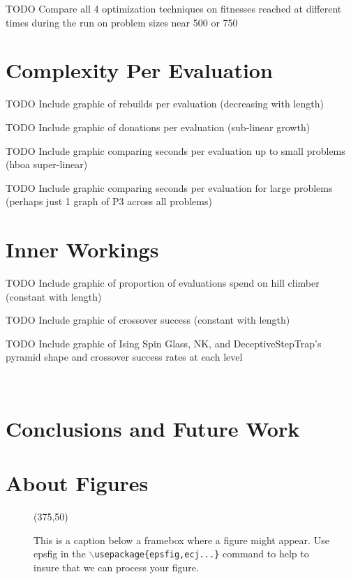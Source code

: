 \documentclass[twoside]{article}
\begin{document}
TODO Compare all 4 optimization techniques on fitnesses reached at different times
during the run on problem sizes near 500 or 750


\section{Complexity Per Evaluation}
TODO Include graphic of rebuilds per evaluation (decreasing with length)

TODO Include graphic of donations per evaluation (sub-linear growth)

TODO Include graphic comparing seconds per evaluation up to small problems (hboa super-linear)

TODO Include graphic comparing seconds per evaluation for large problems (perhaps just 1 graph of P3 across all problems)

\section{Inner Workings}
TODO Include graphic of proportion of evaluations spend on hill climber (constant with length)

TODO Include graphic of crossover success (constant with length)

TODO Include graphic of Ising Spin Glass, NK, and DeceptiveStepTrap's pyramid shape and crossover success rates at each level

~\cite{lobo:2011:dynamicpop}

\section{Conclusions and Future Work}

\section{About Figures}

\begin{figure}[t]
\begin{center}
\centerline{ 
\framebox(375,50)
}
\end{center}
\caption{This is a caption below a framebox where a
figure might appear.  Use epsfig in the {\tt $\backslash$usepackage\{epsfig,ecj...\}} 
command to help to insure that we can process your figure.}
\label{graph1}
\end{figure}

\small



\end{document}
